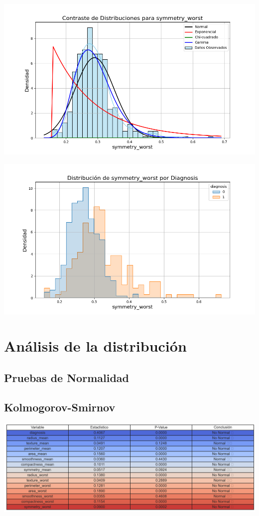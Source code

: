 \documentclass[a4paper, 12pt]{article}
\begin{document}
\includegraphics[width=\textwidth]{../Plots/plots_stats/symmetry_worst/distribuciones_conocidas_symmetry_worst.png}

\includegraphics[width=\textwidth]{../Plots/plots_diagnosis/distribucion_symmetry_worst_por_diagnosis.png}


\newpage

\section{Análisis de la distribución}

\subsection{Pruebas de Normalidad}

\subsection*{Kolmogorov-Smirnov}
\includegraphics[width=\textwidth]{../Plots/resumen_normalidad.png}
\end{document}
